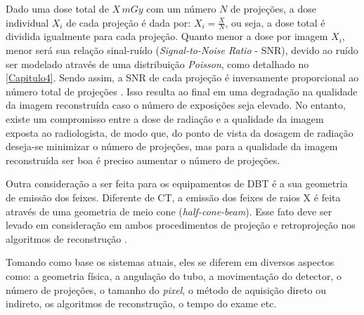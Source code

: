 Dado uma dose total de $X\,mGy$ com um número $N$ de projeções, a dose individual $X_{i}$ de cada projeção é dada por: $X_{i} = \frac{X}{N}$, ou seja, a dose total é dividida igualmente para cada projeção. Quanto menor a dose por imagem $X_{i}$, menor será sua relação sinal-ruído (\textit{Signal-to-Noise Ratio} - \acs{SNR}), devido ao ruído ser modelado através de uma distribuição \textit{Poisson}, como detalhado no \autoref{Capitulo4}. Sendo assim, a \acs{SNR} de cada projeção é inversamente proporcional ao número total de projeções \cite{sechopoulos2009optimization}. Isso resulta ao final em uma degradação na qualidade da imagem reconstruída caso o número de exposições seja elevado.  No entanto, existe um compromisso entre a dose de radiação e a qualidade da imagem exposta ao radiologista, de modo que, do ponto de vista da dosagem de radiação deseja-se minimizar o número de projeções, mas para a qualidade da imagem reconstruída ser boa é preciso aumentar o número de projeções.

Outra consideração a ser feita para os equipamentos de \acs{DBT} é a sua geometria de emissão dos feixes. Diferente de \acs{CT}, a emissão dos feixes de raios X é feita através de uma geometria de meio cone (\textit{half-cone-beam}). Esse fato deve ser levado em consideração em ambos procedimentos de projeção e retroprojeção nos algoritmos de reconstrução \cite{wu2004comparison}. 
        
Tomando como base os sistemas atuais, eles se diferem em diversos aspectos como: a geometria física, a angulação do tubo, a movimentação do detector, o número de projeções, o tamanho do \textit{pixel}, o método de aquisição direto ou indireto, os algoritmos de reconstrução, o tempo do exame etc. 


